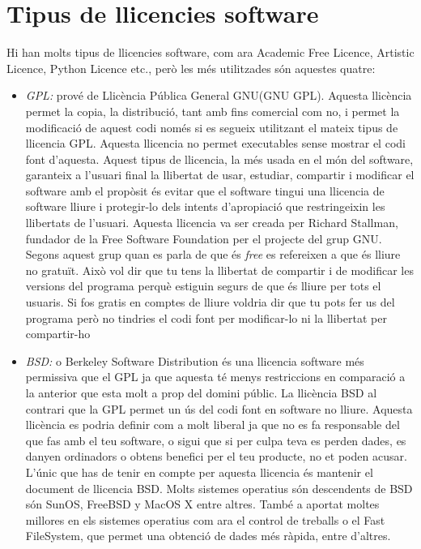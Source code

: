 \section{Tipus de llicencies software}
Hi han molts tipus de llicencies software, com ara Academic Free Licence, 
Artistic Licence, Python Licence etc., però les més utilitzades són aquestes quatre:
\begin{itemize}
\item \emph{GPL:} prové de Llicència Pública General GNU(GNU GPL). Aquesta 
llicència permet la copia, la distribució, tant amb fins comercial com no, i 
permet la modificació de aquest codi només si es segueix utilitzant el mateix 
tipus de llicencia GPL. Aquesta llicencia no permet executables sense mostrar 
el codi font d'aquesta. Aquest tipus de llicencia, la més usada en el món del 
software, garanteix a l'usuari final la llibertat de usar, estudiar, compartir 
i modificar el software amb el propòsit és evitar que el software tingui una 
llicencia de software lliure i protegir-lo dels intents d'apropiació que 
restringeixin les llibertats de l'usuari. Aquesta llicencia va ser creada per 
Richard Stallman, fundador de la Free Software Foundation per el projecte del 
grup GNU.
Segons aquest grup quan es parla de que és \textit{free} es refereixen a que és 
lliure no gratuït. Això vol dir que tu tens la llibertat de compartir i de modificar 
les versions del programa perquè estiguin segurs	de que és lliure per tots el 
usuaris. Si fos gratis en comptes de lliure voldria dir que tu pots fer us del 
programa però no tindries el codi font per modificar-lo ni la llibertat per compartir-ho
\item \emph{BSD:} o Berkeley Software Distribution és una llicencia software més 
permissiva que el GPL ja que aquesta té menys restriccions en comparació a la 
anterior que esta molt a prop del domini públic. La llicència BSD al contrari 
que la GPL permet un ús del codi font en software no lliure. Aquesta llicència 
es podria definir com a molt liberal ja que no es fa responsable del que fas 
amb el teu software, o sigui que si per culpa teva es perden dades, es danyen 
ordinadors o obtens benefici per el teu producte, no et poden acusar. L'únic 
que has de tenir en compte per aquesta llicencia és mantenir el document de 
llicencia BSD. Molts sistemes operatius són descendents de BSD són SunOS, 
FreeBSD y MacOS X entre altres. També a aportat moltes millores en els sistemes 
operatius com ara el control de treballs o el Fast FileSystem, que permet una 
obtenció de dades més ràpida, entre d'altres.

\end{itemize}
